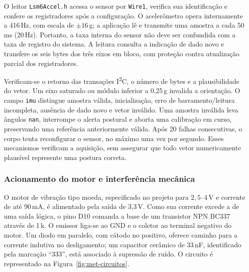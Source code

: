 O leitor \texttt{Lsm6Accel.h} acessa o sensor por \texttt{Wire1}, verifica
sua identificação e confere os registradores após a configuração. O
acelerômetro opera internamente a 416\,Hz, com escala de
$\pm16$\,g; a aplicação lê e transmite uma amostra a cada 50\,ms
(20\,Hz). Portanto, a taxa interna do sensor não deve ser confundida
com a taxa de registro do sistema. A leitura consulta a indicação de
dado novo e transfere os seis bytes dos três eixos em bloco, com
proteção contra atualização parcial dos registradores.

Verificam-se o retorno das transações I\textsuperscript{2}C, o número de
bytes e a plausibilidade do vetor. Um eixo saturado ou módulo inferior
a 0{,}25\,g invalida a orientação. O campo \texttt{imu} distingue
amostra válida, inicialização, erro de barramento/leitura incompleta,
ausência de dado novo e vetor inválido. Uma amostra inválida leva ângulos
\texttt{nan}, interrompe o alerta postural e aborta uma calibração em
curso, preservando uma referência anteriormente válida. Após 20 falhas
consecutivas, o corpo tenta reconfigurar o sensor, no máximo uma vez por
segundo. Esses mecanismos verificam a aquisição, sem assegurar que todo
vetor numericamente plausível represente uma postura correta.

\subsubsection{Acionamento do motor e interferência mecânica}

O motor de vibração tipo moeda, especificado no projeto para
$2{,}5$--4\,V e corrente de até 90\,mA, é alimentado pela saída
de 3{,}3\,V. Como sua corrente excede a de uma saída lógica, o pino
D10 comanda a base de um transistor NPN BC337 através de
1\,k\ohm. O emissor liga-se ao GND e o coletor ao terminal negativo
do motor. Um diodo em paralelo, com cátodo no positivo, oferece caminho
para a corrente indutiva no desligamento; um capacitor cerâmico de
33\,nF, identificado pela marcação ``333'', está associado à supressão
de ruído. O circuito é representado na Figura~\ref{fig:met-circuitos}.

